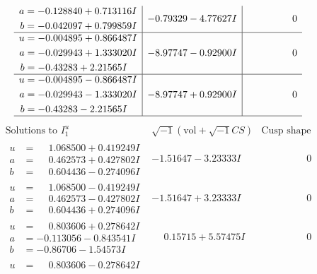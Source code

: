 \documentclass[1p]{elsarticle_modified}
\theoremstyle{definition}
\newcommand{\I}{\sqrt{-1}}
\begin{document}
$$\begin{array}{c|c|c}
\begin{aligned}
a &= -0.128840 + 0.713116 I \\
b &= -0.042097 + 0.799859 I\end{aligned}
 & -0.79329 - 4.77627 I & \phantom{-0.000000 } 0 \\ \hline\begin{aligned}
u &= -0.004895 + 0.866487 I \\
a &= -0.029943 + 1.333020 I \\
b &= -0.43283 + 2.21565 I\end{aligned}
 & -8.97747 - 0.92900 I & \phantom{-0.000000 } 0 \\ \hline\begin{aligned}
u &= -0.004895 - 0.866487 I \\
a &= -0.029943 - 1.333020 I \\
b &= -0.43283 - 2.21565 I\end{aligned}
 & -8.97747 + 0.92900 I & \phantom{-0.000000 } 0\\
 \hline 
 \end{array}$$\newpage$$\begin{array}{c|c|c}  
\text{Solutions to }I^u_{1}& \I (\text{vol} + \sqrt{-1}CS) & \text{Cusp shape}\\
 \hline 
\begin{aligned}
u &= \phantom{-}1.068500 + 0.419249 I \\
a &= \phantom{-}0.462573 + 0.427802 I \\
b &= \phantom{-}0.604436 - 0.274096 I\end{aligned}
 & -1.51647 - 3.23333 I & \phantom{-0.000000 } 0 \\ \hline\begin{aligned}
u &= \phantom{-}1.068500 - 0.419249 I \\
a &= \phantom{-}0.462573 - 0.427802 I \\
b &= \phantom{-}0.604436 + 0.274096 I\end{aligned}
 & -1.51647 + 3.23333 I & \phantom{-0.000000 } 0 \\ \hline\begin{aligned}
u &= \phantom{-}0.803606 + 0.278642 I \\
a &= -0.113056 - 0.843541 I \\
b &= -0.86706 - 1.54573 I\end{aligned}
 & \phantom{-}0.15715 + 5.57475 I & \phantom{-0.000000 } 0 \\ \hline\begin{aligned}
u &= \phantom{-}0.803606 - 0.278642 I \\

\end{aligned}
\end{array}$$
\end{document}

